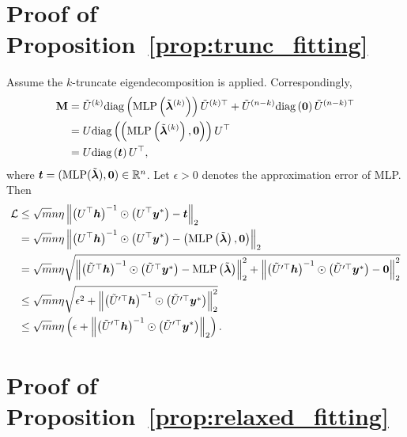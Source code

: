 \documentclass{article} %
\def\vlambda{{\bm\lambda}}
\begin{document}
\section{Proof of Proposition~\ref{prop:trunc_fitting}}
\label{sec:trunc_fitting}
Assume the $k$-truncate eigendecomposition is applied.
Correspondingly,
\begin{equation}
	\begin{aligned}
		\rmM&=\tilde U^{(k)}\mathrm{diag}\left(\mathrm{MLP}\left(\tilde\vlambda^{(k)}\right)\right)\tilde U^{(k)\top}+\tilde U^{(n-k)}\mathrm{diag}\left(\mathbf 0\right)\tilde U^{(n-k)\top}\\
		&=U\mathrm{diag}\left(\left(\mathrm{MLP}\left(\tilde\vlambda^{(k)}\right),\mathbf 0\right)\right)U^{\top}\\
		&=U\mathrm{diag}\left(\vt\right)U^{\top},
	\end{aligned}
\end{equation}
where $\vt=(\mathrm{MLP}(\tilde\vlambda),\mathbf 0)\in\sR^n$.
Let $\epsilon>0$ denotes the approximation error of MLP.
Then
\begin{equation}
	\begin{aligned}
		\gL&\leq\sqrt{m}n\eta\left\|\left(U^{\top}\vh\right)^{-1}\odot\left(U^{\top}\vy^*\right)-\vt\right\|_2\\
		&=\sqrt{m}n\eta\left\|\left(U^{\top}\vh\right)^{-1}\odot\left(U^{\top}\vy^*\right)-\left(\mathrm{MLP}\left(\tilde\vlambda\right),\mathbf 0\right)\right\|_2\\
		&=\sqrt{m}n\eta\sqrt{\left\|\left(\tilde U^{\top}\vh\right)^{-1}\odot\left(\tilde U^{\top}\vy^*\right)-\mathrm{MLP}\left(\tilde\vlambda\right)\right\|_2^2+\left\|\left(\tilde U^{\prime\top}\vh\right)^{-1}\odot\left(\tilde U^{\prime\top}\vy^*\right)-\mathbf 0\right\|_2^2}\\
		&\leq\sqrt{m}n\eta\sqrt{\epsilon^2+\left\|\left(\tilde U^{\prime\top}\vh\right)^{-1}\odot\left(\tilde U^{\prime\top}\vy^*\right)\right\|_2^2}\\
		&\leq\sqrt{m}n\eta\left(\epsilon+\left\|\left(\tilde U^{\prime\top}\vh\right)^{-1}\odot\left(\tilde U^{\prime\top}\vy^*\right)\right\|_2\right).
	\end{aligned}
\end{equation}

\section{Proof of Proposition~\ref{prop:relaxed_fitting}}
\label{sec:relaxed_fitting}
\end{document}
